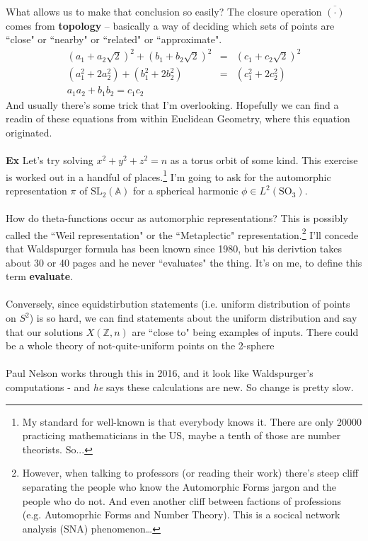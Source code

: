 \documentclass[12pt]{article}
\begin{document}
What allows us to make that conclusion so easily?  The closure operation $\overline{(\cdot)}$ comes from \textbf{topology} -- basically a way of deciding which sets of points are ``close" or ``nearby" or ``related" or ``approximate".
\begin{eqnarray*} (a_1 + a_2 \sqrt{2})^2 + (b_1 + b_2 \sqrt{2})^2 &=& (c_1 + c_2 \sqrt{2})^2 \\ 
(a_1^2 + 2a_2^2 ) + (b_1^2 + 2b_2^2 ) &=& (c_1^2 + 2c_2^2 )  \\ 
a_1 a_2 + b_1 b_2 = c_1c_2\end{eqnarray*}
And usually there's some trick that I'm overlooking.  Hopefully we can find a readin of these equations from within Euclidean Geometry, where this equation originated.\\ \\
\textbf{Ex} Let's try solving $x^2 + y^2 + z^2 = n$ as a torus orbit of some kind.  This exercise is worked out in a handful of places.\footnote{My standard for well-known is that everybody knows it.  There are only 20000 practicing mathematicians in the US, maybe a tenth of those are number theorists.  So... } I'm going to ask for the automorphic representation $\pi$ of $\text{SL}_2(\mathbb{A})$ for a spherical harmonic $\phi \in L^2( \text{SO}_3)$. \\ \\
How do theta-functions occur as automorphic representations?  This is possibly called the ``Weil representation" or the ``Metaplectic" representation.\footnote{However, when talking to professors (or reading their work) there's steep cliff separating the people who know the Automorphic Forms jargon and the people who do not.  And even another cliff between factions of professions (e.g. Automoprhic Forms and Number Theory).  This is a socical network analysis (SNA) phenomenon\dots}  I'll concede that Waldspurger formula has been known since 1980, but his derivtion takes about 30 or 40 pages and he never ``evaluates" the thing.  It's on me, to define this term \textbf{evaluate}. \\ \\
Conversely, since equidstirbution statements (i.e. uniform distribution of points on $S^2$) is so hard, we can find statements about the uniform distribution and say that our solutions $X(\mathbb{Z},n)$ are ``close to" being examples of inputs.  There could be a whole theory of not-quite-uniform points on the 2-sphere \\ \\
Paul Nelson works through this in 2016, and it look like Waldspurger's computations - and \textit{he} says these calculations are new.  So change is pretty slow.
\end{document}
